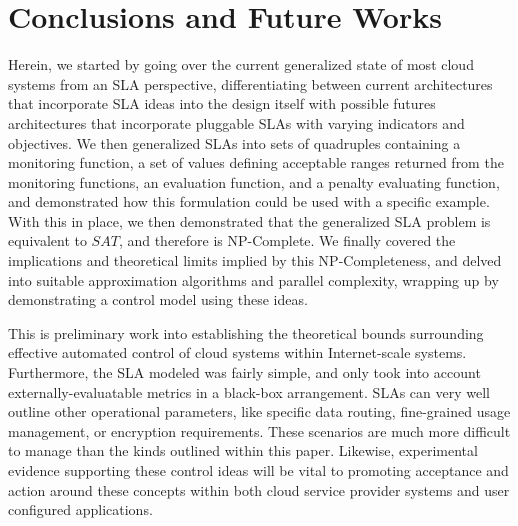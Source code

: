 \section{Conclusions and Future Works}
Herein, we started by going over the current generalized state of most cloud systems from an SLA perspective, differentiating between current architectures that incorporate SLA ideas into the design itself with possible futures architectures that incorporate pluggable SLAs with varying indicators and objectives.  We then generalized SLAs into sets of quadruples containing a monitoring function, a set of values defining acceptable ranges returned from the monitoring functions, an evaluation function, and a penalty evaluating function, and demonstrated how this formulation could be used with a specific example.  With this in place, we then demonstrated that the generalized SLA problem is equivalent to $ SAT $, and therefore is NP-Complete.  We finally covered the implications and theoretical limits implied by this NP-Completeness, and delved into suitable approximation algorithms and parallel complexity, wrapping up by demonstrating a control model using these ideas.

This is preliminary work into establishing the theoretical bounds surrounding effective automated control of cloud systems within Internet-scale systems.  Furthermore, the SLA modeled was fairly simple, and only took into account externally-evaluatable metrics in a black-box arrangement.  SLAs can very well outline other operational parameters, like specific data routing, fine-grained usage management, or encryption requirements.  These scenarios are much more difficult to manage than the kinds outlined within this paper.  Likewise, experimental evidence supporting these control ideas will be vital to promoting acceptance and action around these concepts within both cloud service provider systems and user configured applications.